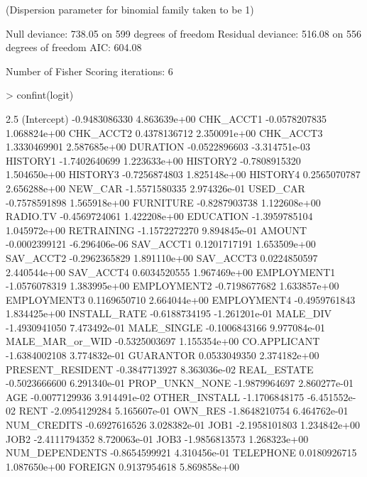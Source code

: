 \documentclass{article}
\begin{document}
\begin{Schunk}
\begin{Soutput}
(Dispersion parameter for binomial family taken to be 1)

    Null deviance: 738.05  on 599  degrees of freedom
Residual deviance: 516.08  on 556  degrees of freedom
AIC: 604.08

Number of Fisher Scoring iterations: 6
\end{Soutput}
\begin{Sinput}
> confint(logit)
\end{Sinput}
\begin{Soutput}
                         2.5 %
(Intercept)      -0.9483086330  4.863639e+00
CHK_ACCT1        -0.0578207835  1.068824e+00
CHK_ACCT2         0.4378136712  2.350091e+00
CHK_ACCT3         1.3330469901  2.587685e+00
DURATION         -0.0522896603 -3.314751e-03
HISTORY1         -1.7402640699  1.223633e+00
HISTORY2         -0.7808915320  1.504650e+00
HISTORY3         -0.7256874803  1.825148e+00
HISTORY4          0.2565070787  2.656288e+00
NEW_CAR          -1.5571580335  2.974326e-01
USED_CAR         -0.7578591898  1.565918e+00
FURNITURE        -0.8287903738  1.122608e+00
RADIO.TV         -0.4569724061  1.422208e+00
EDUCATION        -1.3959785104  1.045972e+00
RETRAINING       -1.1572272270  9.894845e-01
AMOUNT           -0.0002399121 -6.296406e-06
SAV_ACCT1         0.1201717191  1.653509e+00
SAV_ACCT2        -0.2962365829  1.891110e+00
SAV_ACCT3         0.0224850597  2.440544e+00
SAV_ACCT4         0.6034520555  1.967469e+00
EMPLOYMENT1      -1.0576078319  1.383995e+00
EMPLOYMENT2      -0.7198677682  1.633857e+00
EMPLOYMENT3       0.1169650710  2.664044e+00
EMPLOYMENT4      -0.4959761843  1.834425e+00
INSTALL_RATE     -0.6188734195 -1.261201e-01
MALE_DIV         -1.4930941050  7.473492e-01
MALE_SINGLE      -0.1006843166  9.977084e-01
MALE_MAR_or_WID  -0.5325003697  1.155354e+00
CO.APPLICANT     -1.6384002108  3.774832e-01
GUARANTOR         0.0533049350  2.374182e+00
PRESENT_RESIDENT -0.3847713927  8.363036e-02
REAL_ESTATE      -0.5023666600  6.291340e-01
PROP_UNKN_NONE   -1.9879964697  2.860277e-01
AGE              -0.0077129936  3.914491e-02
OTHER_INSTALL    -1.1706848175 -6.451552e-02
RENT             -2.0954129284  5.165607e-01
OWN_RES          -1.8648210754  6.464762e-01
NUM_CREDITS      -0.6927616526  3.028382e-01
JOB1             -2.1958101803  1.234842e+00
JOB2             -2.4111794352  8.720063e-01
JOB3             -1.9856813573  1.268323e+00
NUM_DEPENDENTS   -0.8654599921  4.310456e-01
TELEPHONE         0.0180926715  1.087650e+00
FOREIGN           0.9137954618  5.869858e+00
\end{Soutput}

\end{Schunk}
\end{document}
